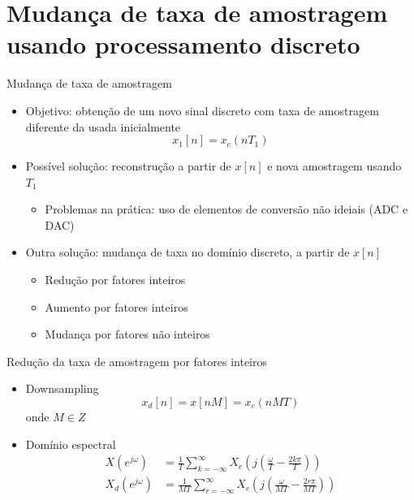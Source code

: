 \section{Mudança de taxa de amostragem usando processamento discreto}
\begin{slide}{Mudança de taxa de amostragem}
	\begin{itemize}
		\item Objetivo: obtenção de um novo sinal discreto com taxa de amostragem diferente da usada inicialmente
			\begin{equation*}
				x_1[n] = x_c(nT_1)
			\end{equation*}
		\item Possível solução: reconstrução a partir de $x[n]$ e nova amostragem usando $T_1$
		\begin{itemize}
			\item Problemas na prática: uso de elementos  de conversão não ideiais (ADC e DAC)
		\end{itemize}
		\item Outra solução: mudança de taxa no domínio discreto, a partir de $x[n]$
		\begin{itemize}
			\item Redução por fatores inteiros
			\item Aumento por fatores inteiros
			\item Mudança por fatores não inteiros
		\end{itemize}
	\end{itemize}
\end{slide}

\begin{slide}{Redução da taxa de amostragem por fatores inteiros}
	\begin{itemize}
		\item Downsampling
			\begin{equation*}
				x_d[n] = x[nM] = x_c(nMT)
			\end{equation*}
			onde $M \in Z$
		\item Domínio espectral
			\begin{align*}
     				X(e^{j\omega})& = \frac{1}{T}\sum_{k=-\infty}^{\infty}X_c\left(j\left(\frac{\omega}{T}-\frac{2k\pi}{T}\right )\right )\\
				X_d(e^{j\omega})& = \frac{1}{MT}\sum_{r=-\infty}^{\infty}X_c\left(j\left(\frac{\omega}{MT}-\frac{2r\pi}{MT}\right )\right )
			\end{align*}
	\end{itemize}
\end{slide}

